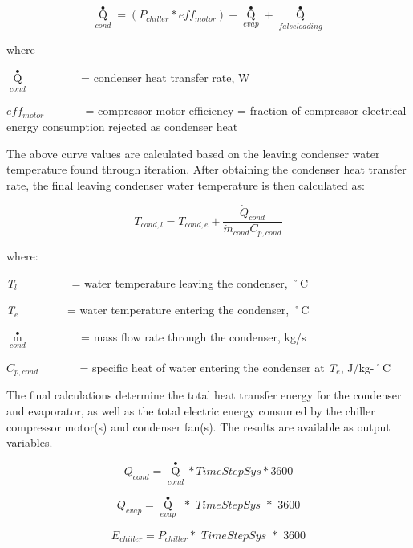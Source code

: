 \begin{equation}
{\mathop Q\limits^ \bullet_{cond}} = \left( {{P_{chiller}} * ef{f_{motor}}} \right) + {\mathop Q\limits^ \bullet_{evap}} + {\mathop Q\limits^ \bullet_{falseloading}}
\end{equation}

where

\({\mathop Q\limits^ \bullet_{cond}}\) ~~~~~~~~ = condenser heat transfer rate, W

\(ef{f_{motor}}\) ~~~~~~ = compressor motor efficiency = fraction of compressor electrical energy consumption rejected as condenser heat

The above curve values are calculated based on the leaving condenser water temperature found through iteration. After obtaining the condenser heat transfer rate, the final leaving condenser water temperature is then calculated as:

\begin{equation}
  T_{cond,l} = T_{cond,e} + \frac{\dot{Q}_{cond}}{\dot{m}_{cond} C_{p,cond}}
\end{equation}

where:

\emph{T\(_{l}\)}~~~~~~~~~ = water temperature leaving the condenser, ˚C

\emph{T\(_{e}\)}~~~~~~~~ = water temperature entering the condenser, ˚C

\({\mathop m\limits^ \bullet_{cond}}\) ~~~~~~~~ = mass flow rate through the condenser, kg/s

\({C_{p,cond}}\) ~~~~~~ = specific heat of water entering the condenser at \emph{T\(_{e}\)}, J/kg-˚C

The final calculations determine the total heat transfer energy for the condenser and evaporator, as well as the total electric energy consumed by the chiller compressor motor(s) and condenser fan(s). The results are available as output variables.

\begin{equation}
{Q_{cond}} = {\mathop Q\limits^ \bullet_{cond}}*TimeStepSys*3600
\end{equation}

\begin{equation}
{Q_{evap}} = {\mathop Q\limits^ \bullet_{evap}}\,\,*\,\,TimeStepSys\,\,*\,\,3600
\end{equation}

\begin{equation}
{E_{chiller}} = {P_{chiller}}*\,\,TimeStepSys\,\,*\,\,3600
\end{equation}

